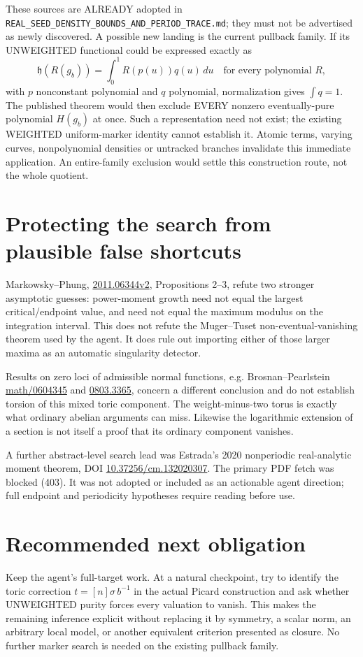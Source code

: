 \documentclass{article}
\begin{document}
These sources are ALREADY adopted in \texttt{REAL\_SEED\_DENSITY\_BOUNDS\_AND\_PERIOD\_TRACE.md}; they must not be advertised as newly discovered. A possible new landing is the current pullback family. If its UNWEIGHTED functional could be expressed exactly as
\[
 \mathfrak h(R(g_b))=\int_0^1 R(p(u))q(u)\,du
 \quad\text{for every polynomial }R,
\]
with $p$ nonconstant polynomial and $q$ polynomial, normalization gives $\int q=1$. The published theorem would then exclude EVERY nonzero eventually-pure polynomial $H(g_b)$ at once. Such a representation need not exist; the existing WEIGHTED uniform-marker identity cannot establish it. Atomic terms, varying curves, nonpolynomial densities or untracked branches invalidate this immediate application. An entire-family exclusion would settle this construction route, not the whole quotient.

\section{Protecting the search from plausible false shortcuts}
Markowsky--Phung, \href{https://arxiv.org/abs/2011.06344v2}{2011.06344v2}, Propositions 2--3, refute two stronger asymptotic guesses: power-moment growth need not equal the largest critical/endpoint value, and need not equal the maximum modulus on the integration interval. This does not refute the Muger--Tuset non-eventual-vanishing theorem used by the agent. It does rule out importing either of those larger maxima as an automatic singularity detector.

Results on zero loci of admissible normal functions, e.g. Brosnan--Pearlstein \href{https://arxiv.org/abs/math/0604345}{math/0604345} and \href{https://arxiv.org/abs/0803.3365}{0803.3365}, concern a different conclusion and do not establish torsion of this mixed toric component. The weight-minus-two torus is exactly what ordinary abelian arguments can miss. Likewise the logarithmic extension of a section is not itself a proof that its ordinary component vanishes.

A further abstract-level search lead was Estrada's 2020 nonperiodic real-analytic moment theorem, DOI \href{https://doi.org/10.37256/cm.132020307}{10.37256/cm.132020307}. The primary PDF fetch was blocked (403). It was not adopted or included as an actionable agent direction; full endpoint and periodicity hypotheses require reading before use.

\section{Recommended next obligation}
Keep the agent's full-target work. At a natural checkpoint, try to identify the toric correction $t=[n]\sigma\,b^{-1}$ in the actual Picard construction and ask whether UNWEIGHTED purity forces every valuation to vanish. This makes the remaining inference explicit without replacing it by symmetry, a scalar norm, an arbitrary local model, or another equivalent criterion presented as closure. No further marker search is needed on the existing pullback family.
\end{document}
